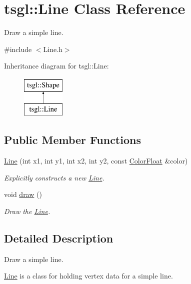 \hypertarget{classtsgl_1_1_line}{\section{tsgl\-:\-:\-Line \-Class \-Reference}
\label{classtsgl_1_1_line}
}


\-Draw a simple line.  




{\ttfamily \#include $<$\-Line.\-h$>$}

\-Inheritance diagram for tsgl\-:\-:\-Line\-:\begin{figure}[H]
\begin{center}
\leavevmode
\includegraphics[height=2.000000cm]{classtsgl_1_1_line}
\end{center}
\end{figure}
\subsection*{\-Public \-Member \-Functions}
\begin{DoxyCompactItemize}
\item 
\hyperlink{classtsgl_1_1_line_af16488259ac5978679e13d58cf7e91ef}{\-Line} (int x1, int y1, int x2, int y2, const \hyperlink{structtsgl_1_1_color_float}{\-Color\-Float} \&color)
\begin{DoxyCompactList}\small\item\em \-Explicitly constructs a new \hyperlink{classtsgl_1_1_line}{\-Line}. \end{DoxyCompactList}\item 
void \hyperlink{classtsgl_1_1_line_ae7eccbbf5230a4c68139560d810af415}{draw} ()
\begin{DoxyCompactList}\small\item\em \-Draw the \hyperlink{classtsgl_1_1_line}{\-Line}. \end{DoxyCompactList}\end{DoxyCompactItemize}


\subsection{\-Detailed \-Description}
\-Draw a simple line. 

\hyperlink{classtsgl_1_1_line}{\-Line} is a class for holding vertex data for a simple line. 

